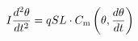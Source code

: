 \documentclass[10pt]{article}
\begin{document}
\begin{align*}I \frac{d^2 \theta}{d t^2} 
=
q S L \cdot C_{\rm m} \left(\theta, \frac{d \theta}{dt} \right)\end{align*}
\end{document}
